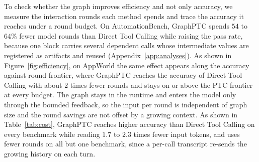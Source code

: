To check whether the graph improves efficiency and not only accuracy, we measure the interaction rounds each method spends and trace the accuracy it reaches under a round budget.
On AutomationBench, GraphPTC spends $54$ to $64\%$ fewer model rounds than Direct Tool Calling while raising the pass rate, because one block carries several dependent calls whose intermediate values are registered as artifacts and reused (Appendix~\ref{app:analyses}).
As shown in Figure~\ref{fig:efficiency}, on AppWorld the same effect appears along the accuracy against round frontier, where GraphPTC reaches the accuracy of Direct Tool Calling with about $2$ times fewer rounds and stays on or above the PTC frontier at every budget.
The graph stays in the runtime and enters the model only through the bounded feedback, so the input per round is independent of graph size and the round savings are not offset by a growing context.
As shown in Table~\ref{tab:cost}, GraphPTC reaches higher accuracy than Direct Tool Calling on every benchmark while reading $1.7$ to $2.3$ times fewer input tokens, and uses fewer rounds on all but one benchmark, since a per-call transcript re-sends the growing history on each turn.

\begin{table}[t]
\centering\scriptsize
\setlength{\abovecaptionskip}{0pt}
\setlength{\belowcaptionskip}{0pt}
\setlength{\tabcolsep}{5pt}
\caption{Cost comparison of GraphPTC and Direct Tool Calling, averaged over four backbones. GraphPTC reaches higher accuracy while reading fewer input tokens on every benchmark and using fewer interaction rounds on all but one. \textbf{Bold} marks the better method per metric and benchmark.}
\label{tab:cost}
\end{table}

